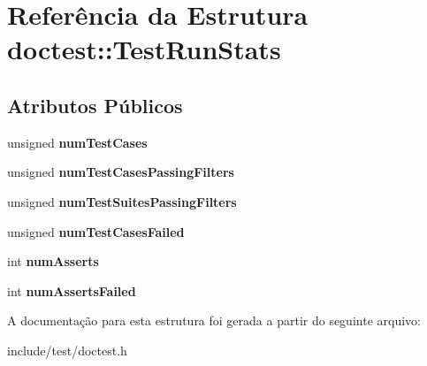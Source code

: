 \hypertarget{structdoctest_1_1TestRunStats}{}\section{Referência da Estrutura doctest\+:\+:Test\+Run\+Stats}
\label{structdoctest_1_1TestRunStats}
\subsection*{Atributos Públicos}
\begin{DoxyCompactItemize}
\item 
\mbox{\label{structdoctest_1_1TestRunStats_a2f4b38f2f6225b798029b64c1d425999}} 
unsigned {\bfseries num\+Test\+Cases}
\item 
\mbox{\label{structdoctest_1_1TestRunStats_afd49da305793d2c2622f0b33a63e87b6}} 
unsigned {\bfseries num\+Test\+Cases\+Passing\+Filters}
\item 
\mbox{\label{structdoctest_1_1TestRunStats_aecbf62d51a6c96875d72124c27096e1d}} 
unsigned {\bfseries num\+Test\+Suites\+Passing\+Filters}
\item 
\mbox{\label{structdoctest_1_1TestRunStats_adb4acfac3623bf752eff3f8d6ce2ffe7}} 
unsigned {\bfseries num\+Test\+Cases\+Failed}
\item 
\mbox{\label{structdoctest_1_1TestRunStats_a58f52d165ab0af01acb7d69a7fc53c3a}} 
int {\bfseries num\+Asserts}
\item 
\mbox{\label{structdoctest_1_1TestRunStats_a27c7ff2c0190e4bad60555cdc68d8f30}} 
int {\bfseries num\+Asserts\+Failed}
\end{DoxyCompactItemize}


A documentação para esta estrutura foi gerada a partir do seguinte arquivo\+:\begin{DoxyCompactItemize}
\item 
include/test/doctest.\+h\end{DoxyCompactItemize}
